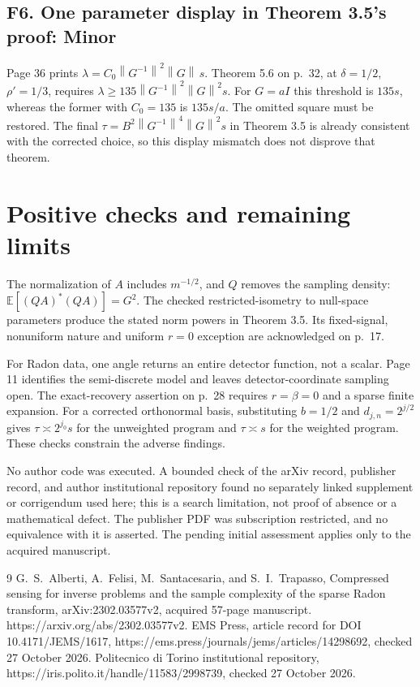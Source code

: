 \documentclass[10pt]{article}
\begin{document}
\subsection*{F6. One parameter display in Theorem 3.5’s proof: Minor}
Page 36 prints \(\lambda=C_0\left\lVert G^{-1}\right\rVert^2\left\lVert G\right\rVert\,s\). Theorem 5.6 on p. 32, at \(\delta=1/2\), \(\rho'=1/3\), requires \(\lambda\ge135\left\lVert G^{-1}\right\rVert^2\left\lVert G\right\rVert^2s\). For \(G=aI\) this threshold is \(135s\), whereas the former with \(C_0=135\) is \(135s/a\). The omitted square must be restored. The final \(\tau=B^2\left\lVert G^{-1}\right\rVert^4\left\lVert G\right\rVert^2s\) in Theorem 3.5 is already consistent with the corrected choice, so this display mismatch does not disprove that theorem.\par
\section*{Positive checks and remaining limits}
The normalization of \(A\) includes \(m^{-1/2}\), and \(Q\) removes the sampling density: \(\mathbb E[(QA)^*(QA)]=G^2\). The checked restricted-isometry to null-space parameters produce the stated norm powers in Theorem 3.5. Its fixed-signal, nonuniform nature and uniform \(r=0\) exception are acknowledged on p. 17.\par
For Radon data, one angle returns an entire detector function, not a scalar. Page 11 identifies the semi-discrete model and leaves detector-coordinate sampling open. The exact-recovery assertion on p. 28 requires \(r=\beta=0\) and a sparse finite expansion. For a corrected orthonormal basis, substituting \(b=1/2\) and \(d_{j,n}=2^{j/2}\) gives \(\tau\asymp2^{j_0}s\) for the unweighted program and \(\tau\asymp s\) for the weighted program. These checks constrain the adverse findings.\par
No author code was executed. A bounded check of the arXiv record, publisher record, and author institutional repository found no separately linked supplement or corrigendum used here; this is a search limitation, not proof of absence or a mathematical defect. The publisher PDF was subscription restricted, and no equivalence with it is asserted. The pending initial assessment applies only to the acquired manuscript.\par
9 G. S. Alberti, A. Felisi, M. Santacesaria, and S. I. Trapasso, Compressed sensing for inverse problems and the sample complexity of the sparse Radon transform, arXiv:2302.03577v2, acquired 57-page manuscript. https://arxiv.org/abs/2302.03577v2. EMS Press, article record for DOI 10.4171/JEMS/1617, https://ems.press/journals/jems/articles/14298692, checked 27 October 2026. Politecnico di Torino institutional repository, https://iris.polito.it/handle/11583/2998739, checked 27 October 2026.\par
\end{document}
